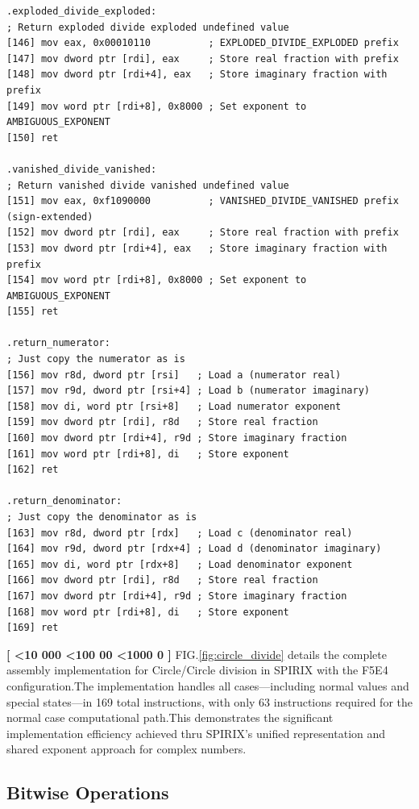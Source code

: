 \documentclass[12pt,letter]{article}
\newcounter{paracounter}
\newcommand{\ppara}[1]{
\noindent\textbf{[\formatparanumber{\arabic{paracounter}}]} \begingroup\RaggedRight\sloppy\hbadness=10000 #1\par\endgroup%
\stepcounter{paracounter}%
}
\newcommand{\formatparanumber}[1]{%
\ifnum#1<10 000%
\else\ifnum#1<100 00%
\else\ifnum#1<1000 0%
\fi\fi\fi#1%
}
\begin{document}
\begin{lstlisting}[style=rust, caption={Full complex division assembly instructions including ambiguous handling}, label={fig:circle_divide}]
.exploded_divide_exploded:
; Return exploded divide exploded undefined value
[146] mov eax, 0x00010110          ; EXPLODED_DIVIDE_EXPLODED prefix
[147] mov dword ptr [rdi], eax     ; Store real fraction with prefix
[148] mov dword ptr [rdi+4], eax   ; Store imaginary fraction with prefix
[149] mov word ptr [rdi+8], 0x8000 ; Set exponent to AMBIGUOUS_EXPONENT
[150] ret

.vanished_divide_vanished:
; Return vanished divide vanished undefined value
[151] mov eax, 0xf1090000          ; VANISHED_DIVIDE_VANISHED prefix (sign-extended)
[152] mov dword ptr [rdi], eax     ; Store real fraction with prefix
[153] mov dword ptr [rdi+4], eax   ; Store imaginary fraction with prefix
[154] mov word ptr [rdi+8], 0x8000 ; Set exponent to AMBIGUOUS_EXPONENT
[155] ret

.return_numerator:
; Just copy the numerator as is
[156] mov r8d, dword ptr [rsi]   ; Load a (numerator real)
[157] mov r9d, dword ptr [rsi+4] ; Load b (numerator imaginary)
[158] mov di, word ptr [rsi+8]   ; Load numerator exponent
[159] mov dword ptr [rdi], r8d   ; Store real fraction
[160] mov dword ptr [rdi+4], r9d ; Store imaginary fraction
[161] mov word ptr [rdi+8], di   ; Store exponent
[162] ret

.return_denominator:
; Just copy the denominator as is
[163] mov r8d, dword ptr [rdx]   ; Load c (denominator real)
[164] mov r9d, dword ptr [rdx+4] ; Load d (denominator imaginary)
[165] mov di, word ptr [rdx+8]   ; Load denominator exponent
[166] mov dword ptr [rdi], r8d   ; Store real fraction
[167] mov dword ptr [rdi+4], r9d ; Store imaginary fraction
[168] mov word ptr [rdi+8], di   ; Store exponent
[169] ret
\end{lstlisting}

\ppara{FIG.\hspace{0.2cm}\ref{fig:circle_divide} details the complete assembly implementation for Circle/Circle division in SPIRIX with the F5E4 configuration.\hspace{0.2cm}The implementation handles all cases—including normal values and special states—in 169 total instructions, with only 63 instructions required for the normal case computational path.\hspace{0.2cm}This demonstrates the significant implementation efficiency achieved thru SPIRIX's unified representation and shared exponent approach for complex numbers.}
\newpage
\subsection*{Bitwise Operations}
\end{document}
